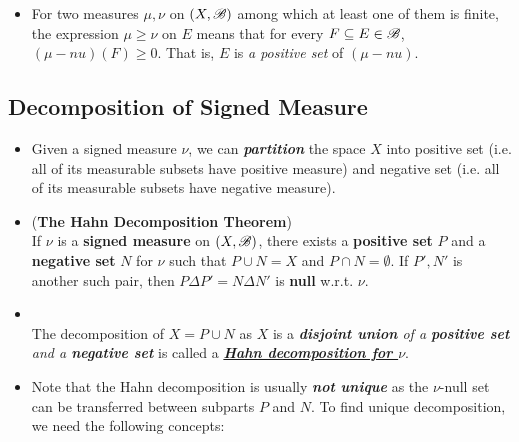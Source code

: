\documentclass[11pt]{article}
\begin{document}
\begin{itemize}
\item \begin{remark}
For two measures $\mu, \nu$  on $(X,{\mathscr B})$ among which at least one of them is finite, the expression $\mu \ge \nu$ on $E$ means that for every $F \subseteq E \in {\mathscr B}$,  $(\mu-nu)(F) \ge 0$. That is, $E$ is \emph{a positive set} of $(\mu-nu)$.
\end{remark}
\end{itemize}

\subsection{Decomposition of Signed Measure}
\begin{itemize}
\item \begin{remark}
Given a signed measure $\nu$, we can \emph{\textbf{partition}} the space $X$ into positive set (i.e. all of its measurable subsets have positive measure) and negative set (i.e. all of its measurable subsets have negative measure).
\end{remark}

\item \begin{theorem}(\textbf{The Hahn Decomposition Theorem})\citep{folland2013real}\\
If $\nu$ is a \textbf{signed measure} on $(X,{\mathscr B})$, there exists a \textbf{positive set} $P$ and a \textbf{negative set} $N$ for $\nu$ such that $P\cup N= X$ and $P\cap N=\emptyset$. If $P', N'$ is another such pair, then $P\Delta P'= N\Delta N'$ is \textbf{null} w.r.t. $\nu$.
\end{theorem}

\item \begin{definition}\citep{folland2013real, resnick2013probability}\\
The decomposition of $X = P\cup N$ as $X$ is a \emph{\textbf{disjoint union} of a \textbf{positive set} and a \textbf{negative set}} is called a \underline{\emph{\textbf{Hahn decomposition for $\nu$}}}.
\end{definition}

\item \begin{remark}
Note that the Hahn decomposition is usually \emph{\textbf{not unique}} as the $\nu$-null set can be transferred between subparts $P$ and $N$. To find unique decomposition, we need the following concepts:
\end{remark}


\end{itemize}
\end{document}
